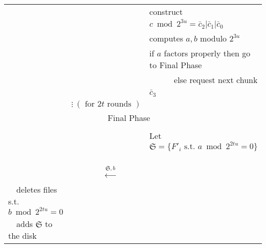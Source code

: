 \documentclass[11pt]{llncs}
\begin{document}
\begin{center}
\begin{tabular}{lcl}
                                   &                                                      &construct $c\bmod 2^{3u}=\bar{c}_2|\bar{c}_1|\bar{c}_0$~~\\
                                   &                                                      &computes $a,b$ modulo $2^{3u}$~\\
                                   &                                                      &if $a$ factors properly then go to {\sf Final Phase}~~\\
                                   &                                                      &~~~~~~else request next chunk $\bar{c}_3$~~\\
                                   &                  $\vdots~(\mbox{~for~}2t
\mbox{~rounds~})$    & \\\midrule
\multicolumn{3}{c}{{\sf Final Phase~~}} \\\midrule
                                   &                                                      & \\
                                   &                                                      &Let $\mathfrak{S}=\{F'_i \mbox{~s.t.~} a \bmod 2^{2tu} =0\}$~~\\
                                   &~~{\LARGE $\stackrel{\mathfrak{S},b}{\longleftarrow}$}&\\
                                   ~~deletes files s.t. $b \bmod 2^{2t u} =0$&        &\\
                                   ~~adds $\mathfrak{S}$ to the disk
                                   &
                                   &\\\bottomrule
\end{tabular}
\end{center}
\end{document}
